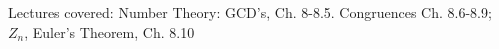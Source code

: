 \documentclass[handout]{mcs}
\begin{document}
\renewcommand{\reading}{Chapter~\bref{number_theory_chap}.\ \emph{Number Theory} through~\bref{Euler_sec}.\ \emph{Euler's Theorem}.}


\begin{staffnotes}
Lectures covered: Number Theory: GCD's, Ch. 8-8.5. Congruences
Ch. 8.6-8.9; $Z_n$, Euler's Theorem, Ch. 8.10
\end{staffnotes}







\end{document}

